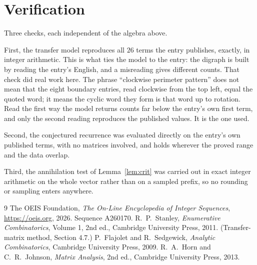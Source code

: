 \documentclass[11pt,a4paper]{article}
\theoremstyle{plain}
\theoremstyle{definition}
\begin{document}
\section{Verification}

Three checks, each independent of the algebra above.

First, the transfer model reproduces all $26$ terms the entry publishes, exactly, in
integer arithmetic. This is what ties the model to the entry: the digraph is built by reading
the entry's English, and a misreading gives different counts. That check did real work here. The phrase ``clockwise perimeter pattern'' does not mean that the eight boundary entries, read clockwise from the top left, equal the quoted word; it means the cyclic word they form is that word up to rotation. Read the first way the model returns counts far below the entry's own first term, and only the second reading reproduces the published values. It is the one used.

Second, the conjectured recurrence was evaluated directly on the entry's own published terms,
with no matrices involved, and holds wherever the proved range and the data overlap.

Third, the annihilation test of Lemma~\ref{lem:crit} was carried out in exact integer
arithmetic on the whole vector rather than on a sampled prefix, so no rounding or sampling
enters anywhere.

\begin{thebibliography}{9}
 The OEIS Foundation, \emph{The On-Line Encyclopedia of Integer
Sequences}, \url{https://oeis.org}, 2026. Sequence A260170.
 R.~P.~Stanley, \emph{Enumerative Combinatorics}, Volume 1, 2nd ed.,
Cambridge University Press, 2011. (Transfer-matrix method, Section 4.7.)
 P.~Flajolet and R.~Sedgewick, \emph{Analytic Combinatorics}, Cambridge
University Press, 2009.
 R.~A.~Horn and C.~R.~Johnson, \emph{Matrix Analysis}, 2nd ed., Cambridge
University Press, 2013.
\end{thebibliography}
\end{document}
